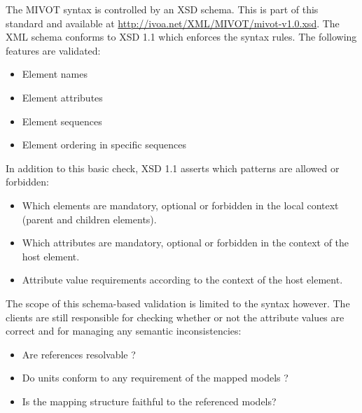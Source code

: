 The MIVOT syntax is controlled by an XSD schema.
This is part of this standard and available at \url{http://ivoa.net/XML/MIVOT/mivot-v1.0.xsd}.
The XML schema conforms to XSD 1.1 \citep{std:xsd1.1} which enforces the syntax rules. 
The following features are validated:

\begin{itemize} 
  \item Element names 
  \item Element attributes
  \item Element sequences 
  \item Element ordering in specific sequences
\end{itemize}

In addition to this basic check, XSD 1.1 asserts which patterns are allowed or forbidden:

\begin{itemize} 
  \item Which elements are mandatory, optional  or forbidden in the local context (parent and children elements).
  \item Which attributes are mandatory, optional  or forbidden in the context of the host element.
  \item Attribute value requirements according to the context of the host element.
\end{itemize}
 
The scope of this schema-based validation is limited to the syntax however. 
The clients are still responsible for checking whether or not the attribute values are correct and for managing any semantic inconsistencies:

\begin{itemize} 
  \item Are references resolvable ?
  \item Do units conform to any requirement of the mapped models ?
  \item Is the mapping structure faithful to the referenced models?
\end{itemize}


